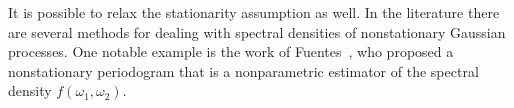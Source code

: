 It is possible to relax the stationarity assumption as well. In the literature there are several methods for dealing with spectral densities of nonstationary Gaussian processes. One notable example is the work of Fuentes~\cite{fuentes2002spectral}, who proposed a nonstationary periodogram that is a nonparametric estimator of the spectral density $f(\omega_1, \omega_2)$.





